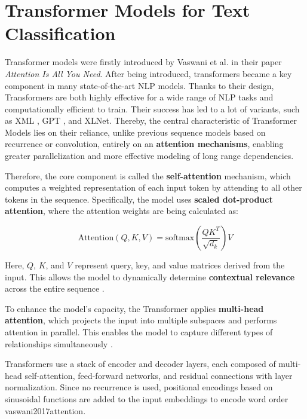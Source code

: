 \section{Transformer Models for Text Classification}


Transformer models were firstly introduced by Vaswani et al. \parencite{vaswani2017attention} in their paper \textit{Attention Is All You Need}. After being introduced, transformers became a key component in many state-of-the-art NLP models. Thanks to their design, Transformers are both highly effective for a wide range of NLP tasks and computationally efficient to train. Their success has led to a lot of variants, such as XML \parencite{lample2019cross}, GPT \parencite{radford2018gpt}, and XLNet\parencite{yang2019xlnet}. Thereby, the central characteristic of Transformer Models lies on their reliance, unlike previous sequence models based on recurrence or convolution, entirely on an \textbf{attention mechanisms}, enabling greater parallelization and more effective modeling of long range dependencies.

Therefore, the core component is called the \textbf{self-attention} mechanism, which computes a weighted representation of each input token by attending to all other tokens in the sequence. Specifically, the model uses \textbf{scaled dot-product attention}, where the attention weights are being calculated as:

\[
\text{Attention}(Q, K, V) = \text{softmax}\left(\frac{QK^T}{\sqrt{d_k}}\right)V
\]

Here, $Q$, $K$, and $V$ represent query, key, and value matrices derived from the input. This allows the model to dynamically determine \textbf{contextual relevance} across the entire sequence \parencite{vaswani2017attention}.

To enhance the model's capacity, the Transformer applies \textbf{multi-head attention}, which projects the input into multiple subspaces and performs attention in parallel. This enables the model to capture different types of relationships simultaneously \parencite{vaswani2017attention}.

Transformers use a stack of encoder and decoder layers, each composed of multi-head self-attention, feed-forward networks, and residual connections with layer normalization. Since no recurrence is used, positional encodings based on sinusoidal functions are added to the input embeddings to encode word order {vaswani2017attention}.

